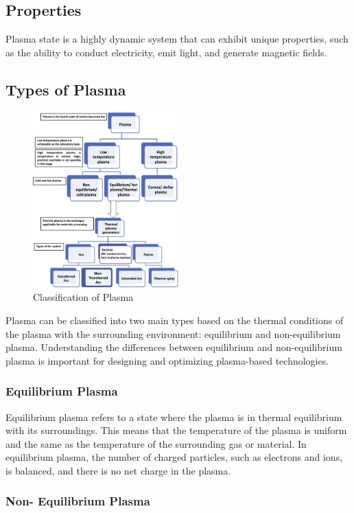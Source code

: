 \documentclass{article}
\begin{document}
\subsection{Properties}
\large
Plasma state is a highly dynamic system that can exhibit unique properties, such as the ability to conduct electricity, emit light, and generate magnetic fields.
\subsection{Types of Plasma}
 \begin{figure}[h]
\centering
\includegraphics[width=0.5\textwidth]{Plasma Table.jpg}
\caption{\label{fig:Plasma Table } Classification of Plasma}
\end{figure}
Plasma can be classified into two main types based on the thermal conditions of the plasma with the surrounding environment: equilibrium and non-equilibrium plasma.
Understanding the differences between equilibrium and non-equilibrium plasma is important for designing and optimizing plasma-based technologies.

\subsubsection{Equilibrium Plasma}
Equilibrium plasma refers to a state where the plasma is in thermal equilibrium with its surroundings. This means that the temperature of the plasma is uniform and the same as the temperature of the surrounding gas or material. In equilibrium plasma, the number of charged particles, such as electrons and ions, is balanced, and there is no net charge in the plasma.
\subsubsection{Non- Equilibrium Plasma}
\end{document}
